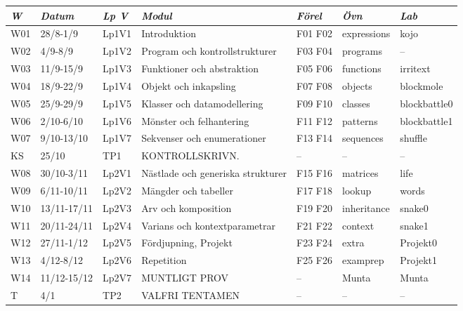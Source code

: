 \begin{tabular}{l|l|l|l|l|l|l}
\textit{W} & \textit{Datum} & \textit{Lp V} & \textit{Modul} & \textit{Förel} & \textit{Övn} & \textit{Lab} \\ \hline \hline
W01 & 28/8-1/9 & Lp1V1 & Introduktion & F01 F02 & expressions & kojo \\
W02 & 4/9-8/9 & Lp1V2 & Program och kontrollstrukturer & F03 F04 & programs & -- \\
W03 & 11/9-15/9 & Lp1V3 & Funktioner och abstraktion & F05 F06 & functions & irritext \\
W04 & 18/9-22/9 & Lp1V4 & Objekt och inkapsling & F07 F08 & objects & blockmole \\
W05 & 25/9-29/9 & Lp1V5 & Klasser och datamodellering & F09 F10 & classes & blockbattle0 \\
W06 & 2/10-6/10 & Lp1V6 & Mönster och felhantering & F11 F12 & patterns & blockbattle1 \\
W07 & 9/10-13/10 & Lp1V7 & Sekvenser och enumerationer & F13 F14 & sequences & shuffle \\
KS & 25/10 & TP1 & KONTROLLSKRIVN. & -- & -- & -- \\
W08 & 30/10-3/11 & Lp2V1 & Nästlade och generiska strukturer & F15 F16 & matrices & life \\
W09 & 6/11-10/11 & Lp2V2 & Mängder och tabeller & F17 F18 & lookup & words \\
W10 & 13/11-17/11 & Lp2V3 & Arv och komposition & F19 F20 & inheritance & snake0 \\
W11 & 20/11-24/11 & Lp2V4 & Varians och kontextparametrar & F21 F22 & context & snake1 \\
W12 & 27/11-1/12 & Lp2V5 & Fördjupning, Projekt & F23 F24 & extra & Projekt0 \\
W13 & 4/12-8/12 & Lp2V6 & Repetition & F25 F26 & examprep & Projekt1 \\
W14 & 11/12-15/12 & Lp2V7 & MUNTLIGT PROV & -- & Munta & Munta \\
T & 4/1 & TP2 & VALFRI TENTAMEN & -- & -- & -- \\
\end{tabular}
